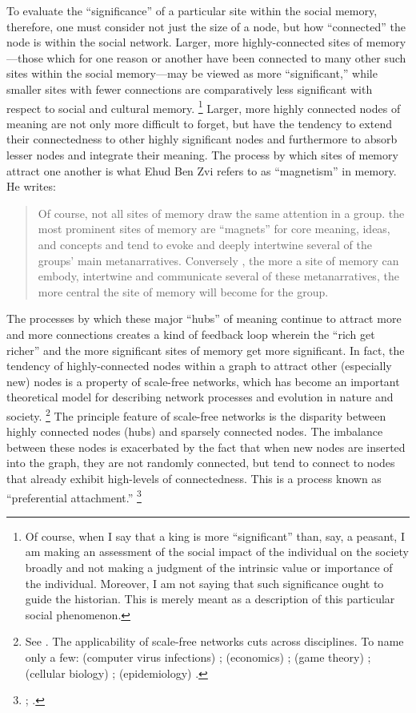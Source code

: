 To evaluate the ``significance'' of a particular site within the social memory, therefore, one must consider not just the size of a node, but how ``connected'' the node is within the social network. Larger, more highly-connected sites of memory---those which for one reason or another have been connected to many other such sites within the social memory---may be viewed as more ``significant,'' while smaller sites with fewer connections are comparatively less significant with respect to social and cultural memory.%
    \footnote{Of course, when I say that a king is more ``significant'' than, say, a peasant, I am making an assessment of the social impact of the individual on the society broadly and not making a judgment of the intrinsic value or importance of the individual. Moreover, I am not saying that such significance ought to guide the historian. This is merely meant as a description of this particular social phenomenon.}
Larger, more highly connected nodes of meaning are not only more difficult to forget, but have the tendency to extend their connectedness to other highly significant nodes and furthermore to absorb lesser nodes and integrate their meaning. The process by which sites of memory attract one another is what Ehud Ben Zvi refers to as ``magnetism'' in memory. He writes:
\begin{quote}
    Of course, not all sites of memory draw the same attention in a group. the most prominent sites of memory are ``magnets'' for core meaning, ideas, and concepts and tend to evoke and deeply intertwine several of the groups' main metanarratives. Conversely , the more a site of memory can embody, intertwine and communicate several of these metanarratives, the more central the site of memory will become for the group.\autocite[73]{benzvi_st2017}
\end{quote}
\noindent
The processes by which these major ``hubs'' of meaning continue to attract more and more connections creates a kind of feedback loop wherein the ``rich get richer'' and the more significant sites of memory get more significant. In fact, the tendency of highly-connected nodes within a graph to attract other (especially new) nodes is a property of scale-free networks, which has become an important theoretical model for describing network processes and evolution in nature and society.%
    \footnote{See \cite[30--33]{caldarelli2007}. The applicability of scale-free networks cuts across disciplines. To name only a few: 
        (computer virus infections) \cite{satorras-alessandro_prl2001};
        (economics) \cite{garlaschelli-etal_pysisca-a2005};
        (game theory) \cite{santos-pacheo_prl2005};
        (cellular biology) \cite{albert_jcs2005};
        (epidemiology) \cite{may-lloyd_pre2001}.}
The principle feature of scale-free networks is the disparity between highly connected nodes (hubs) and sparsely connected nodes. The imbalance between these nodes is exacerbated by the fact that when new nodes are inserted into the graph, they are not randomly connected, but tend to connect to nodes that already exhibit high-levels of connectedness. This is a process known as ``preferential attachment.''%
    \footnote{%
        \cite{barabasi-albert_science1999};
        \cite{jeong-etal_epl2003}.}

